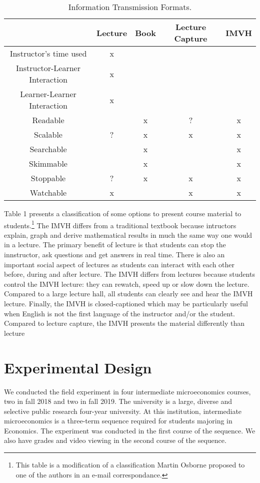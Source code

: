 \documentclass[12pt]{article}
\begin{document}
\begin{table}
	\caption{Information Transmission Formats.}
	\centering
	\begin{tabular}{c|c|c|c|c}
		\hline
		& Lecture & Book & Lecture Capture & IMVH\\
		\hline
		Instructor's time used & x & & &\\
		Instructor-Learner Interaction & x & & &\\
		Learner-Learner Interaction & x & & & \\
		Readable & & x & ? & x \\
		Scalable & ? & x & x & x\\
		Searchable & & x & & x \\
		Skimmable & & x & & x\\
		Stoppable & ? & x & x & x\\
		Watchable & x & & x & x\\

		\hline

	\end{tabular}
	\label{infotransmission}
\end{table}

Table 1 presents a classification of some options to present course material to students.\footnote{This table is a modification of a classification Martin Osborne proposed to one of the authors in an e-mail correspondance.} The IMVH differs from a traditional textbook because intructors explain, graph and derive mathematical results in much the same way one would in a lecture. The primary benefit of lecture is that students can stop the innstructor, ask questions and get answers in real time. There is also an important social aspect of lectures as students can interact with each other before, during and after lecture. The IMVH differs from lectures because students control the IMVH lecture: they can rewatch, speed up or slow down the lecture. Compared to a large lecture hall, all students can clearly see and hear the IMVH lecture. Finally, the IMVH is closed-captioned which may be particularly useful when English is not the first language of the instructor and/or the student. Compared to lecture capture, the IMVH presents the material differently than lecture


\section{Experimental Design} \label{expdesign}
We conducted the field experiment in four intermediate microeconomics courses, two in fall 2018 and two in fall 2019. The university is a large, diverse and selective public research four-year university. At this institution, intermediate microeconomics is a three-term sequence required for students majoring in Economics. The experiment was conducted in the first course of the sequence. We also have grades and video viewing in the second course of the sequence.
\end{document}
